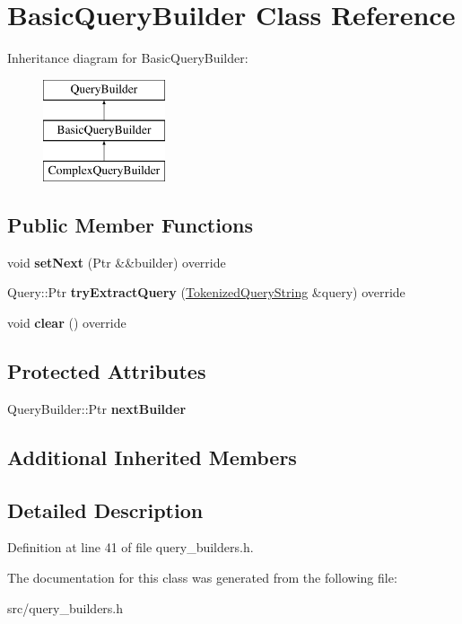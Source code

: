 \hypertarget{class_basic_query_builder}{}\section{Basic\+Query\+Builder Class Reference}
\label{class_basic_query_builder}
Inheritance diagram for Basic\+Query\+Builder\+:\begin{figure}[H]
\begin{center}
\leavevmode
\includegraphics[height=3.000000cm]{class_basic_query_builder}
\end{center}
\end{figure}
\subsection*{Public Member Functions}
\begin{DoxyCompactItemize}
\item 
\mbox{\label{class_basic_query_builder_a6f58c9f285534e2328181b7c68246280}} 
void {\bfseries set\+Next} (Ptr \&\&builder) override
\item 
\mbox{\label{class_basic_query_builder_a3e8fdcf7b700314b4375c2e46a4499b4}} 
Query\+::\+Ptr {\bfseries try\+Extract\+Query} (\hyperlink{struct_tokenized_query_string}{Tokenized\+Query\+String} \&query) override
\item 
\mbox{\label{class_basic_query_builder_ad519076333d8b586fa75cc6a4f65379e}} 
void {\bfseries clear} () override
\end{DoxyCompactItemize}
\subsection*{Protected Attributes}
\begin{DoxyCompactItemize}
\item 
\mbox{\label{class_basic_query_builder_a65dcd7fb6b9e9c468124c75740750718}} 
Query\+Builder\+::\+Ptr {\bfseries next\+Builder}
\end{DoxyCompactItemize}
\subsection*{Additional Inherited Members}


\subsection{Detailed Description}


Definition at line 41 of file query\+\_\+builders.\+h.



The documentation for this class was generated from the following file\+:\begin{DoxyCompactItemize}
\item 
src/query\+\_\+builders.\+h\end{DoxyCompactItemize}
